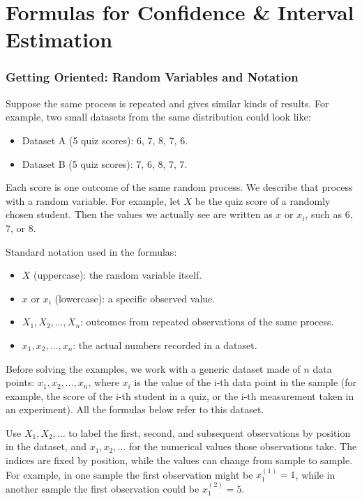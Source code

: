 \chapter{Formulas for Confidence \& Interval Estimation}\label{sec:interval-formulas}

\subsection{Getting Oriented: Random Variables and Notation}\label{sec:interval-notation}

Suppose the same process is repeated and gives similar kinds of results. For example, two small datasets from the same distribution could look like:

\begin{itemize}
	\item Dataset A (5 quiz scores): 6, 7, 8, 7, 6.
	\item Dataset B (5 quiz scores): 7, 6, 8, 7, 7.
\end{itemize}

Each score is one outcome of the same random process. We describe that process with a random variable. For example, let \(X\) be the quiz score of a randomly chosen student. Then the values we actually see are written as \(x\) or \(x_i\), such as 6, 7, or 8.

Standard notation used in the formulas:

\begin{itemize}
	\item \(X\) (uppercase): the random variable itself.
	\item \(x\) or \(x_i\) (lowercase): a specific observed value.
	\item \(X_1, X_2, \dots, X_n\): outcomes from repeated observations of the same process.
	\item \(x_1, x_2, \dots, x_n\): the actual numbers recorded in a dataset.
\end{itemize}

Before solving the examples, we work with a generic dataset made of \(n\) data points: \(x_1, x_2, \dots, x_n\), where \(x_i\) is the value of the i-th data point in the sample (for example, the score of the i-th student in a quiz, or the i-th measurement taken in an experiment). All the formulas below refer to this dataset.

Use \(X_1, X_2, \dots\) to label the first, second, and subsequent observations by position in the dataset, and \(x_1, x_2, \dots\) for the numerical values those observations take. The indices are fixed by position, while the values can change from sample to sample. For example, in one sample the first observation might be \(x_1^{(1)} = 1\), while in another sample the first observation could be \(x_1^{(2)} = 5\).

